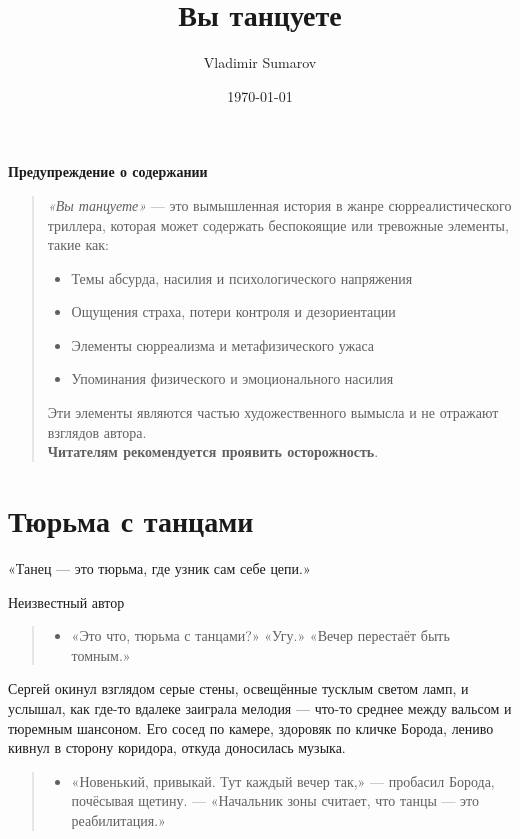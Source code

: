 \documentclass[12pt,a4paper]{book}
\title{Вы танцуете} %
\author{Vladimir Sumarov} %
\date{\today}
\newenvironment{dialogue}{\begin{quote}\itshape\begin{itemize}\item[]}{\end{itemize}\end{quote}}
\begin{document}
\maketitle
\clearpage %
\begin{center}
    \vspace*{2cm}
    {\Large \textbf{Предупреждение о содержании}} \\
    \vspace{1cm}
\end{center}

\begin{quote}
\textit{«Вы танцуете»} --- это вымышленная история в жанре сюрреалистического триллера, которая может содержать беспокоящие или тревожные элементы, такие как:
\begin{itemize}
    \item Темы абсурда, насилия и психологического напряжения
    \item Ощущения страха, потери контроля и дезориентации
    \item Элементы сюрреализма и метафизического ужаса
    \item Упоминания физического и эмоционального насилия
\end{itemize}

Эти элементы являются частью художественного вымысла и не отражают взглядов автора. \\
\textbf{Читателям рекомендуется проявить осторожность}.
\end{quote}

\clearpage %
\tableofcontents
\clearpage

\chapter{Тюрьма с танцами}
\epigraph{«Танец --- это тюрьма, где узник сам себе цепи.»}{Неизвестный автор}

\begin{dialogue}
«Это что, тюрьма с танцами?»
«Угу.»
«Вечер перестаёт быть томным.»
\end{dialogue}

Сергей окинул взглядом серые стены, освещённые тусклым светом ламп, и услышал, как где-то вдалеке заиграла мелодия --- что-то среднее между вальсом и тюремным шансоном. Его сосед по камере, здоровяк по кличке Борода, лениво кивнул в сторону коридора, откуда доносилась музыка.

\begin{dialogue}
«Новенький, привыкай. Тут каждый вечер так,» --- пробасил Борода, почёсывая щетину. --- «Начальник зоны считает, что танцы --- это реабилитация.»
\end{dialogue}
\end{document}

